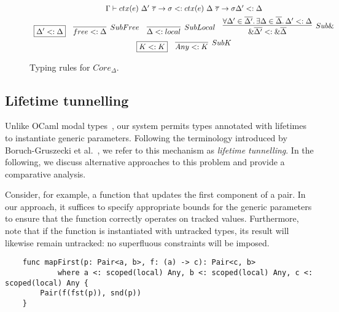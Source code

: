 \documentclass[acmsmall,review,screen]{acmart}
\newcommand{\mathframebox}[1]{\framebox{$\displaystyle #1$}}
\newcommand{\ctx}[1]{ctx(#1)~}
\begin{document}
\begin{figure}
\begin{gather*}
\begin{array}{cc}
{                \Gamma\vdash\ctx{e}\Delta'~\overline{\tau}\to\sigma <: \ctx{e}\Delta~\overline{\tau}\to\sigma
            }{
                \Delta' <: \Delta
            }
        \end{array} \\
        \begin{array}{cccc}
            \mathframebox{\Delta' <: \Delta} &
            \infer[SubFree]{free <: \Delta}{} &
            \infer[SubLocal]{\Delta <: local}{} &
            \infer[Sub\&]{
                \&\overline{\Delta'} <: \&\overline{\Delta}
            }{
                \forall\Delta'\in\overline{\Delta'}\ldotp\exists\Delta\in\overline{\Delta}\ldotp \Delta' <: \Delta
            }
        \end{array} \\
        \begin{array}{cc}
            \mathframebox{K <: K} & \infer[SubK]{Any <: K}{}
        \end{array}
    \end{gather*}
    \caption{Typing rules for $Core_{\Delta}$.}
    \label{fig:core-delta-typing}
\end{figure}



\subsection{Lifetime tunnelling}

Unlike OCaml modal types~\cite{lorenzen2024oxidizing}, our system permits types annotated with lifetimes to instantiate generic parameters.
Following the terminology introduced by Boruch-Gruszecki et al.~\cite{boruch2023capturing}, we refer to this mechanism as \emph{lifetime tunnelling}.
In the following, we discuss alternative approaches to this problem and provide a comparative analysis. %

Consider, for example, a function that updates the first component of a pair.
In our approach, it suffices to specify appropriate bounds for the generic parameters to ensure that the function correctly operates on tracked values.
Furthermore, note that if the function is instantiated with untracked types, its result will likewise remain untracked: no superfluous constraints will be imposed.
\begin{verbatim}
    func mapFirst(p: Pair<a, b>, f: (a) -> c): Pair<c, b>
            where a <: scoped(local) Any, b <: scoped(local) Any, c <: scoped(local) Any {
        Pair(f(fst(p)), snd(p))
    }
\end{verbatim}
\end{document}
